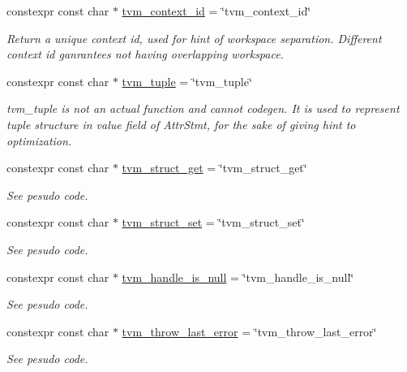 \begin{DoxyCompactItemize}
constexpr const char $\ast$ \hyperlink{namespacetvm_1_1tir_1_1intrinsic_af3a86e8446b1f2b078597cb7cdadfbff}{tvm\+\_\+context\+\_\+id} = \char`\"{}tvm\+\_\+context\+\_\+id\char`\"{}
\begin{DoxyCompactList}\small\item\em Return a unique context id, used for hint of workspace separation. Different context id ganrantees not having overlapping workspace. \end{DoxyCompactList}\item 
constexpr const char $\ast$ \hyperlink{namespacetvm_1_1tir_1_1intrinsic_a19fa5d609f7ae416ede0eb14f1b4b165}{tvm\+\_\+tuple} = \char`\"{}tvm\+\_\+tuple\char`\"{}
\begin{DoxyCompactList}\small\item\em tvm\+\_\+tuple is not an actual function and cannot codegen. It is used to represent tuple structure in value field of Attr\+Stmt, for the sake of giving hint to optimization. \end{DoxyCompactList}\item 
constexpr const char $\ast$ \hyperlink{namespacetvm_1_1tir_1_1intrinsic_aba1b46cdb01d149f49d6676b889142b5}{tvm\+\_\+struct\+\_\+get} = \char`\"{}tvm\+\_\+struct\+\_\+get\char`\"{}
\begin{DoxyCompactList}\small\item\em See pesudo code. \end{DoxyCompactList}\item 
constexpr const char $\ast$ \hyperlink{namespacetvm_1_1tir_1_1intrinsic_a2857ab6a0557554feee6e21dbd37eab9}{tvm\+\_\+struct\+\_\+set} = \char`\"{}tvm\+\_\+struct\+\_\+set\char`\"{}
\begin{DoxyCompactList}\small\item\em See pesudo code. \end{DoxyCompactList}\item 
constexpr const char $\ast$ \hyperlink{namespacetvm_1_1tir_1_1intrinsic_ab5761917c5bd5b727203ddbc84763423}{tvm\+\_\+handle\+\_\+is\+\_\+null} = \char`\"{}tvm\+\_\+handle\+\_\+is\+\_\+null\char`\"{}
\begin{DoxyCompactList}\small\item\em See pesudo code. \end{DoxyCompactList}\item 
constexpr const char $\ast$ \hyperlink{namespacetvm_1_1tir_1_1intrinsic_ad86e388d33768f6641d60a2e1d142cbb}{tvm\+\_\+throw\+\_\+last\+\_\+error} = \char`\"{}tvm\+\_\+throw\+\_\+last\+\_\+error\char`\"{}
\begin{DoxyCompactList}\small\item\em See pesudo code. \end{DoxyCompactList}\item 

\end{DoxyCompactItemize}
